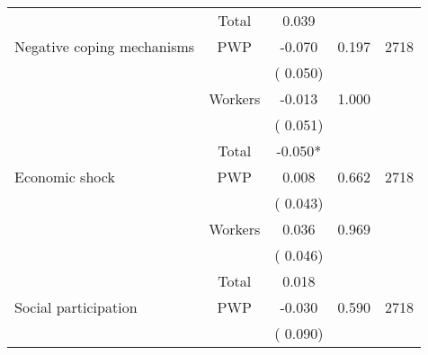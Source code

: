 \begin{tabular}{l*{4}{c}}
\cmidrule{2-3}
                               &       Total           &              0.039               &   &                                               \\ 
\cmidrule{2-3}
 Negative coping mechanisms                &       PWP     &             -0.070               &        0.197   & 2718                              \\ 
                               &                               &       (       0.050)                     & &                                                                             \\ 
                               &       Workers         &             -0.013               &        1.000   &                                               \\ 
                               &                               &       (       0.051)                     & &                                                                             \\ 
\cmidrule{2-3}
                               &       Total           &             -0.050*               &   &                                               \\ 
\cmidrule{2-3}
 Economic shock                &       PWP     &              0.008               &        0.662   & 2718                              \\ 
                               &                               &       (       0.043)                     & &                                                                             \\ 
                               &       Workers         &              0.036               &        0.969   &                                               \\ 
                               &                               &       (       0.046)                     & &                                                                             \\ 
\cmidrule{2-3}
                               &       Total           &              0.018               &   &                                               \\ 
\cmidrule{2-3}
 Social participation                &       PWP     &             -0.030               &        0.590   & 2718                              \\ 
                               &                               &       (       0.090)                     & &                                                                             \\ 

\end{tabular}
